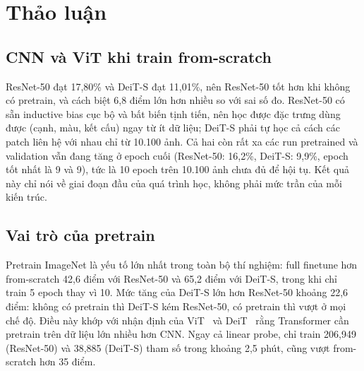 \documentclass[11pt, a4paper]{article}
\begin{document}
\section{Thảo luận}

\subsection{CNN và ViT khi train from-scratch}
ResNet-50 đạt 17,80\% và DeiT-S đạt 11,01\%, nên ResNet-50 tốt hơn khi không có pretrain, và cách biệt 6,8 điểm lớn hơn nhiều so với sai số đo. ResNet-50 có sẵn inductive bias cục bộ và bất biến tịnh tiến, nên học được đặc trưng dùng được (cạnh, màu, kết cấu) ngay từ ít dữ liệu; DeiT-S phải tự học cả cách các patch liên hệ với nhau chỉ từ 10.100 ảnh.
Cả hai còn rất xa các run pretrained và validation vẫn đang tăng ở epoch cuối (ResNet-50: 16,2\%, DeiT-S: 9,9\%, epoch tốt nhất là 9 và 9), tức là 10 epoch trên 10.100 ảnh chưa đủ để hội tụ. Kết quả này chỉ nói về giai đoạn đầu của quá trình học, không phải mức trần của mỗi kiến trúc.

\subsection{Vai trò của pretrain}
Pretrain ImageNet là yếu tố lớn nhất trong toàn bộ thí nghiệm: full finetune hơn from-scratch 42,6 điểm với ResNet-50 và 65,2 điểm với DeiT-S, trong khi chỉ train 5 epoch thay vì 10. Mức tăng của DeiT-S lớn hơn ResNet-50 khoảng 22,6 điểm: không có pretrain thì DeiT-S kém ResNet-50, có pretrain thì vượt ở mọi chế độ. Điều này khớp với nhận định của ViT~\cite{dosovitskiy2021vit} và DeiT~\cite{touvron2021deit} rằng Transformer cần pretrain trên dữ liệu lớn nhiều hơn CNN. Ngay cả linear probe, chỉ train 206,949 (ResNet-50) và 38,885 (DeiT-S) tham số trong khoảng 2,5 phút, cũng vượt from-scratch hơn 35 điểm.
\end{document}
